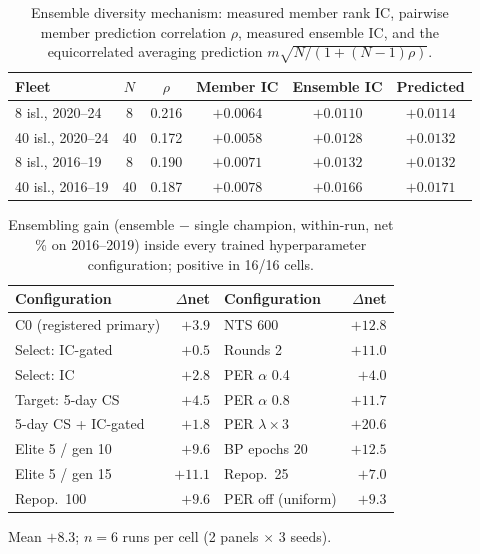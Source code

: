\begin{table}[h]
\centering
\caption{Ensemble diversity mechanism: measured member rank IC, pairwise
member prediction correlation $\rho$, measured ensemble IC, and the
equicorrelated averaging prediction $m\sqrt{N/(1+(N-1)\rho)}$.}
\label{tab:diversity}
\begin{tabular}{lccccc}
\toprule
Fleet & $N$ & $\rho$ & Member IC & Ensemble IC & Predicted \\
\midrule
8 isl., 2020--24  & 8  & 0.216 & $+0.0064$ & $+0.0110$ & $+0.0114$ \\
40 isl., 2020--24 & 40 & 0.172 & $+0.0058$ & $+0.0128$ & $+0.0132$ \\
8 isl., 2016--19  & 8  & 0.190 & $+0.0071$ & $+0.0132$ & $+0.0132$ \\
40 isl., 2016--19 & 40 & 0.187 & $+0.0078$ & $+0.0166$ & $+0.0171$ \\
\bottomrule
\end{tabular}
\end{table}

\begin{table}[h]
\centering
\begin{threeparttable}
\caption{Ensembling gain (ensemble $-$ single champion, within-run, net \%
on 2016--2019) inside every trained hyperparameter configuration; positive
in 16/16 cells.}
\label{tab:invariance}
\begin{tabular}{lr@{\qquad}lr}
\toprule
Configuration & $\Delta$net & Configuration & $\Delta$net \\
\midrule
C0 (registered primary) & $+3.9$  & NTS 600            & $+12.8$ \\
Select: IC-gated        & $+0.5$  & Rounds 2           & $+11.0$ \\
Select: IC              & $+2.8$  & PER $\alpha$ 0.4   & $+4.0$  \\
Target: 5-day CS        & $+4.5$  & PER $\alpha$ 0.8   & $+11.7$ \\
5-day CS + IC-gated     & $+1.8$  & PER $\lambda{\times}3$ & $+20.6$ \\
Elite 5 / gen 10        & $+9.6$  & BP epochs 20       & $+12.5$ \\
Elite 5 / gen 15        & $+11.1$ & Repop.\ 25         & $+7.0$  \\
Repop.\ 100             & $+9.6$  & PER off (uniform)  & $+9.3$  \\
\bottomrule
\end{tabular}
\begin{tablenotes}\footnotesize
\item Mean $+8.3$; $n{=}6$ runs per cell (2 panels $\times$ 3 seeds).
\end{tablenotes}
\end{threeparttable}
\end{table}

